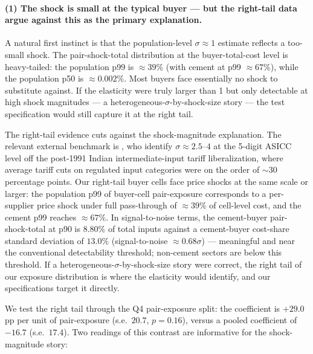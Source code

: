 \paragraph{(1) The shock is small at the typical buyer --- but the right-tail data argue against this as the primary explanation.} A natural first instinct is that the population-level $\sigma \approx 1$ estimate reflects a too-small shock. The pair-shock-total distribution at the buyer-total-cost level is heavy-tailed: the population p99 is $\approx 39\%$ (with cement at p99 $\approx 67\%$), while the population p50 is $\approx 0.002\%$. Most buyers face essentially no shock to substitute against. If the elasticity were truly larger than 1 but only detectable at high shock magnitudes --- a heterogeneous-$\sigma$-by-shock-size story --- the test specification would still capture it at the right tail.

The right-tail evidence cuts against the shock-magnitude explanation. The relevant external benchmark is \citet{peter2023}, who identify $\sigma \approx 2.5$--$4$ at the 5-digit ASICC level off the post-1991 Indian intermediate-input tariff liberalization, where average tariff cuts on regulated input categories were on the order of $\sim$30 percentage points. Our right-tail buyer cells face price shocks at the same scale or larger: the population p99 of buyer-cell pair-exposure corresponds to a per-supplier price shock under full pass-through of $\approx 39\%$ of cell-level cost, and the cement p99 reaches $\approx 67\%$. In signal-to-noise terms, the cement-buyer pair-shock-total at p90 is $8.80\%$ of total inputs against a cement-buyer cost-share standard deviation of $13.0\%$ (signal-to-noise $\approx 0.68\sigma$) --- meaningful and near the conventional detectability threshold; non-cement sectors are below this threshold. If a heterogeneous-$\sigma$-by-shock-size story were correct, the right tail of our exposure distribution is where the elasticity would identify, and our specifications target it directly.

We test the right tail through the Q4 pair-exposure split: the coefficient is $+29.0$ pp per unit of pair-exposure (s.e.\ $20.7$, $p = 0.16$), versus a pooled coefficient of $-16.7$ (s.e.\ $17.4$). Two readings of this contrast are informative for the shock-magnitude story:

